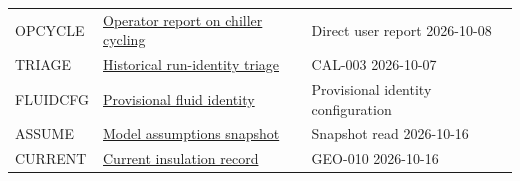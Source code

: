 \documentclass[11pt]{article}
\begin{document}
\begin{longtable}{>{\raggedright\arraybackslash}p{}>{\raggedright\arraybackslash}p{}>{\raggedright\arraybackslash}p{}}
OPCYCLE & \href{https://github.com/Andresfierro231/Trident-Flow-Loop-Documented-Geometry/blob/main/support/evidence/2026-10-16_CFG-002_vcu_current_understanding/OPCYCLE_operator_update.json}{Operator report on chiller cycling} & Direct user report 2026-10-08\\[4pt]
TRIAGE & \href{https://github.com/Andresfierro231/Trident-Flow-Loop-Documented-Geometry/blob/main/support/evidence/2026-10-16_CFG-002_vcu_current_understanding/TRIAGE_README.md}{Historical run-identity triage} & CAL-003 2026-10-07\\[4pt]
FLUIDCFG & \href{https://github.com/Andresfierro231/Trident-Flow-Loop-Documented-Geometry/blob/main/support/evidence/2026-10-16_CFG-002_vcu_current_understanding/FLUIDCFG_fluid.yaml}{Provisional fluid identity} & Provisional identity configuration\\[4pt]
ASSUME & \href{https://github.com/Andresfierro231/Trident-Flow-Loop-Documented-Geometry/blob/main/support/evidence/2026-10-16_CFG-002_vcu_current_understanding/ASSUME_ASSUMPTIONS.md}{Model assumptions snapshot} & Snapshot read 2026-10-16\\[4pt]
CURRENT & \href{https://github.com/Andresfierro231/Trident-Flow-Loop-Documented-Geometry/blob/main/support/evidence/2026-10-16_CFG-002_vcu_current_understanding/CURRENT_INSULATION_CURRENT.md}{Current insulation record} & GEO-010 2026-10-16\\[4pt]
\bottomrule\end{longtable}\endgroup
\end{document}
